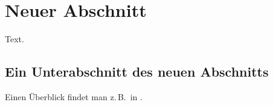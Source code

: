 \section{Neuer Abschnitt}
\label{s:neuerAb}

Text.

\subsection{Ein Unterabschnitt des neuen Abschnitts}
\label{s:neuesKap:abc}

Einen Überblick findet man z.\,B.\ in \cite{CBM07:stuff}.


